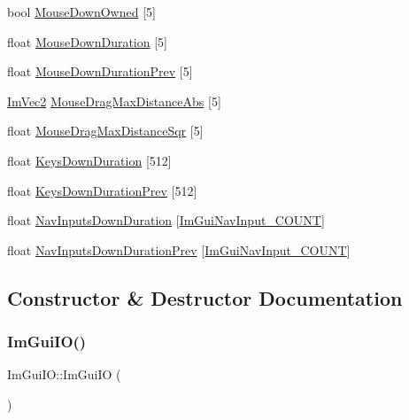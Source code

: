 \begin{DoxyCompactItemize}
\item 
bool \mbox{\hyperlink{struct_im_gui_i_o_a682f98d817f99058136cb47cf8a9bcc3}{Mouse\+Down\+Owned}} \mbox{[}5\mbox{]}
\item 
float \mbox{\hyperlink{struct_im_gui_i_o_ab464bf317051bbdf1c93ab36802fe3b7}{Mouse\+Down\+Duration}} \mbox{[}5\mbox{]}
\item 
float \mbox{\hyperlink{struct_im_gui_i_o_a59d19cf7ad831e57ce15f90295871881}{Mouse\+Down\+Duration\+Prev}} \mbox{[}5\mbox{]}
\item 
\mbox{\hyperlink{struct_im_vec2}{Im\+Vec2}} \mbox{\hyperlink{struct_im_gui_i_o_a402bca8838011fc4518c0895f24ffc92}{Mouse\+Drag\+Max\+Distance\+Abs}} \mbox{[}5\mbox{]}
\item 
float \mbox{\hyperlink{struct_im_gui_i_o_a86c7fe77349fd82a60ab7a279aa27f01}{Mouse\+Drag\+Max\+Distance\+Sqr}} \mbox{[}5\mbox{]}
\item 
float \mbox{\hyperlink{struct_im_gui_i_o_a6f1da2ea6d8e3398d9526fe983cf0a6f}{Keys\+Down\+Duration}} \mbox{[}512\mbox{]}
\item 
float \mbox{\hyperlink{struct_im_gui_i_o_ac079dcd415784a08fec74388e18abb97}{Keys\+Down\+Duration\+Prev}} \mbox{[}512\mbox{]}
\item 
float \mbox{\hyperlink{struct_im_gui_i_o_a4709a8f5435a50387d60ccb6fa928cf6}{Nav\+Inputs\+Down\+Duration}} \mbox{[}\mbox{\hyperlink{imgui_8h_a1b685ae2d3bd43e9665e1b3e0f578117a649aced582f4c80f70b83814051ffcb3}{Im\+Gui\+Nav\+Input\+\_\+\+C\+O\+U\+NT}}\mbox{]}
\item 
float \mbox{\hyperlink{struct_im_gui_i_o_ae2301639fd3e881177815d3b0133068f}{Nav\+Inputs\+Down\+Duration\+Prev}} \mbox{[}\mbox{\hyperlink{imgui_8h_a1b685ae2d3bd43e9665e1b3e0f578117a649aced582f4c80f70b83814051ffcb3}{Im\+Gui\+Nav\+Input\+\_\+\+C\+O\+U\+NT}}\mbox{]}
\end{DoxyCompactItemize}


\subsection{Constructor \& Destructor Documentation}
\mbox{\label{struct_im_gui_i_o_a0ad8d993e50108b81b0d279d2d43f69d}} 
\subsubsection{\texorpdfstring{Im\+Gui\+I\+O()}{ImGuiIO()}}
{\footnotesize\ttfamily Im\+Gui\+I\+O\+::\+Im\+Gui\+IO (\begin{DoxyParamCaption}{ }\end{DoxyParamCaption})}



